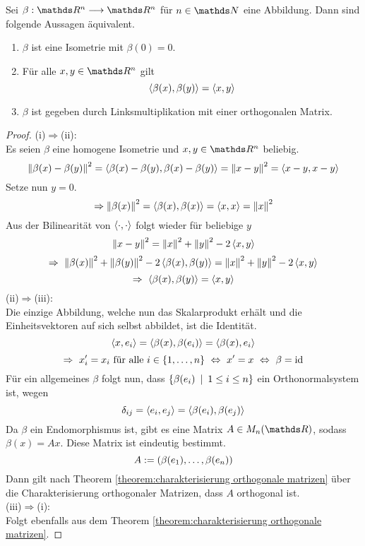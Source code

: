 		\begin{theorem}
			Sei $\beta:\SR^n\longrightarrow \SR^n$ für $n\in\SN$ eine Abbildung.
			Dann sind folgende Aussagen äquivalent.
			\begin{enumerate}[label = \normalfont(\roman*)]
				\item $\beta$ ist eine Isometrie mit $\beta(0)=0$.
				\item Für alle $x,y\in\SR^n$ gilt 
					\[
						\left\langle \beta(x), \beta(y) \right\rangle = \left\langle x,y \right\rangle
					\]
				\item $\beta$ ist gegeben durch Linksmultiplikation mit einer orthogonalen Matrix.
			\end{enumerate}

		\end{theorem}
		\begin{proof}
			(i)$\Rightarrow$(ii):\\
			Es seien $\beta$ eine homogene Isometrie und $x,y\in\SR^n$ beliebig.
			\[
				\left\| \beta(x)-\beta(y) \right\|^2 = \left\langle \beta(x)-\beta(y), \beta(x)-\beta(y) \right\rangle = \left\| x-y \right\|^2 = \left\langle x-y,x-y \right\rangle
			\]
			Setze nun $y=0$.
			\[
				\Rightarrow \left\| \beta(x) \right\|^2 = \left\langle \beta(x),\beta(x) \right\rangle = \left\langle x,x \right\rangle = \left\| x \right\|^2
			\]
			Aus der Bilinearität von $\left\langle \cdot,\cdot \right\rangle$ folgt wieder für beliebige $y$
			\[
				\left\| x-y \right\|^2 = \left\| x \right\|^2 + \left\| y \right\|^2 - 2\left\langle x,y \right\rangle
			\]
			\[
				\Rightarrow \ \norm{\beta(x)}^2 + \norm{\beta(y)}^2 - 2\angleb{\beta(x),\beta(y)} = \norm{x}^2 + \norm{y}^2 - 2\angleb{x,y}
			\]
			\[
				\Rightarrow \ \left\langle \beta(x), \beta(y) \right\rangle = \left\langle x,y \right\rangle
			\]
			(ii)$\Rightarrow$(iii):\\
			Die einzige Abbildung, welche nun das Skalarprodukt erhält und die Einheitsvektoren auf sich selbst abbildet, ist die Identität.
			\[
				\left\langle x,e_i \right\rangle = \left\langle \beta(x), \beta(e_i) \right\rangle = \left\langle \beta(x), e_i \right\rangle
			\]
			\[
				\Rightarrow \ x_i^\prime = x_i \text{ für alle } i\in\curlb{1,\ldots,n} \ \Leftrightarrow \ x^\prime = x \ \Leftrightarrow \ \beta = \id
			\]
			Für ein allgemeines $\beta$ folgt nun, dass $\left\{ \beta(e_i) \enspace \middle\vert \enspace 1\leq i\leq n \right\}$ ein Orthonormalsystem ist, wegen
			\[
				\delta_{ij} = \left\langle e_i,e_j \right\rangle = \left\langle \beta(e_i),\beta(e_j) \right\rangle
			\]
			Da $\beta$ ein Endomorphismus ist, gibt es eine Matrix $A\in M_n(\SR)$, sodass $\beta(x) = Ax$.
			Diese Matrix ist eindeutig bestimmt.
			\[
				A:=\left( \beta(e_1),\ldots,\beta(e_n) \right)
			\]
			Dann gilt nach Theorem \ref{theorem:charakterisierung orthogonale matrizen} über die Charakterisierung orthogonaler Matrizen, dass $A$ orthogonal ist.\smallskip \\
			(iii)$\Rightarrow$(i):\\
			Folgt ebenfalls aus dem Theorem \ref{theorem:charakterisierung orthogonale matrizen}.
		\end{proof}

